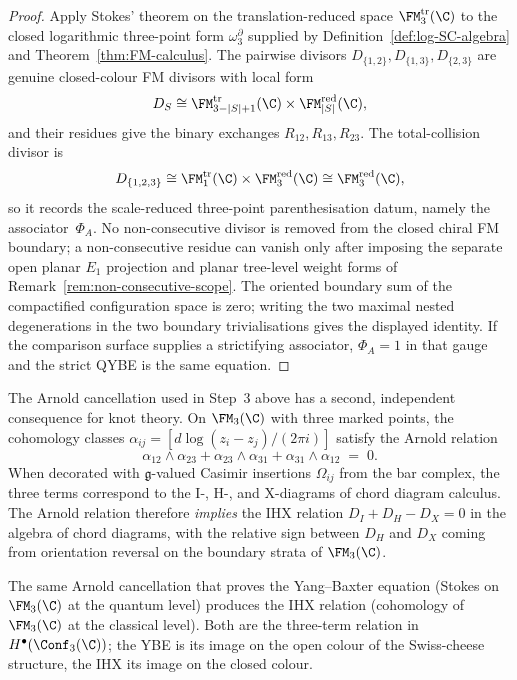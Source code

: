 \begin{proof}
Apply Stokes' theorem on the translation-reduced space
\(\FM^{\mathrm{tr}}_3(\C)\) to the closed logarithmic
three-point form $\omega_3^\partial$ supplied by
Definition~\ref{def:log-SC-algebra} and
Theorem~\ref{thm:FM-calculus}. The pairwise divisors
$D_{\{1,2\}},D_{\{1,3\}},D_{\{2,3\}}$ are genuine closed-colour FM
divisors with local form
\[
D_S \cong
\FM^{\mathrm{tr}}_{3-|S|+1}(\C)\times
\FM^{\mathrm{red}}_{|S|}(\C),
\]
and their residues give the binary exchanges
$R_{12},R_{13},R_{23}$. The total-collision divisor is
\[
D_{\{1,2,3\}}\cong
\FM^{\mathrm{tr}}_1(\C)\times\FM^{\mathrm{red}}_3(\C)
\cong \FM^{\mathrm{red}}_3(\C),
\]
so it records the scale-reduced three-point parenthesisation datum,
namely the associator~$\Phi_A$. No non-consecutive divisor is removed
from the closed chiral FM boundary; a non-consecutive residue can
vanish only after imposing the separate open planar \(E_1\) projection
and planar tree-level weight forms of
Remark~\ref{rem:non-consecutive-scope}. The oriented boundary sum of
the compactified configuration space is zero; writing the two maximal
nested degenerations in the two boundary
trivialisations gives the displayed identity. If the comparison
surface supplies a strictifying associator, $\Phi_A=1$ in that gauge
and the strict QYBE is the same equation.
\end{proof}

\begin{remark}
\label{rem:IHX-Arnold}
The Arnold cancellation used in Step~3 above has a second,
independent consequence for knot theory. On $\FM_3(\C)$ with
three marked points, the cohomology classes
$\alpha_{ij} = [d\log(z_i - z_j)/(2\pi i)]$ satisfy the Arnold
relation
\[
 \alpha_{12} \wedge \alpha_{23}
 + \alpha_{23} \wedge \alpha_{31}
 + \alpha_{31} \wedge \alpha_{12}
 \;=\; 0.
\]
When decorated with $\mathfrak{g}$-valued Casimir insertions
$\Omega_{ij}$ from the bar complex, the three terms correspond
to the I-, H-, and X-diagrams of chord diagram calculus. The
Arnold relation therefore \emph{implies} the IHX relation
$D_I + D_H - D_X = 0$ in the algebra of chord diagrams, with
the relative sign between $D_H$ and $D_X$ coming from
orientation reversal on the boundary strata of $\FM_3(\C)$.

The same Arnold cancellation that proves the Yang--Baxter equation
(Stokes on $\FM_3(\C)$ at the quantum level) produces the
IHX relation (cohomology of $\FM_3(\C)$ at the classical
level). Both are the three-term relation
in $H^\bullet(\Conf_3(\C))$; the YBE is its image on the open colour
of the Swiss-cheese structure, the IHX its image on the closed colour.
\end{remark}

